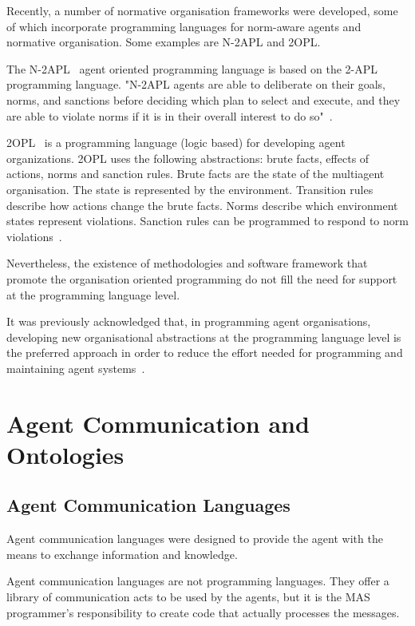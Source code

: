 \documentclass[a4paper,12pt,oneside,fleqn]{book} %
\begin{document}
Recently, a number of normative organisation frameworks were developed,
some of which incorporate programming languages for norm-aware agents and
normative organisation. Some examples are N-2APL and 2OPL.

The N-2APL~\cite{DBLP:conf/aamas/AlechinaDL12} agent oriented programming
language is based on the 2-APL programming language. "N-2APL agents are able
to deliberate on their goals, norms, and sanctions before deciding which
plan to select and execute, and they are able to violate norms if it is in
their overall interest to do so"~\cite{DBLP:conf/atal/DybalovaTDL13}.

2OPL~\cite{DBLP:conf/atal/DybalovaTDL13} is a programming language (logic
based) for developing agent organizations.  2OPL uses the following
abstractions: brute facts, effects of actions, norms and sanction rules.
Brute facts are the state of the multiagent organisation. The state is
represented by the environment.  Transition rules describe how
actions change the brute facts. Norms describe which environment states
represent violations.  Sanction rules can be programmed to respond to norm
violations~\cite{dastani2009programming}. 

Nevertheless, the existence of methodologies and software framework that
promote the organisation oriented programming do not fill the need for
support at the programming language level.

It was previously acknowledged that, in programming agent organisations,
developing new organisational abstractions at the programming language
level is the preferred approach in order to reduce the effort needed for
programming and maintaining agent
systems~\cite{DBLP:conf/esaw/RiemsdijkHJ09}.


\chapter{Agent Communication and Ontologies} %

\section{Agent Communication Languages} %
Agent communication languages were designed to provide the agent with the 
means to exchange information and knowledge.

Agent communication languages are not programming languages. They offer a
library of communication acts to be used by the agents, but it is the MAS
programmer's responsibility to create code that actually processes the
messages.
\end{document}
